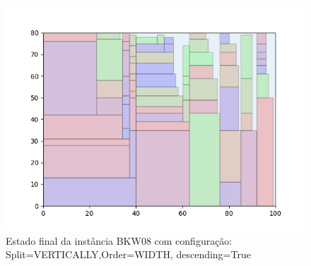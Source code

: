 \begin{figure}[H]
    \centering
    \caption[]{Estado final da instância BKW08 com configuração: Split=VERTICALLY,Order=WIDTH, descending=True}
    \label{fig:bkw08-vertically-width-true}
    \includegraphics[scale=0.5]{output/figures/bkw/bkw08/vertically/width/true/00}
\end{figure}